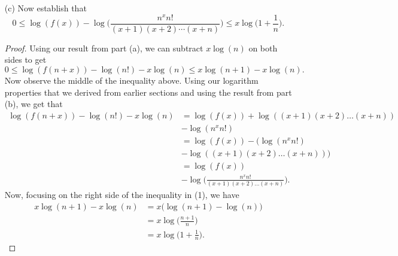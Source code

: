 \begin{enumerate}
\begin{proof}
\begin{align*}
            \end{align*}
            Now assume the statement holds for \( n \geq 1  \). For the \( n+1  \) case, observe that 
            \begin{align*}
                \log(f(x+(n+1)))  &= \log(f((x+n) + 1 ))  \\
                                  &= \log(f(x+n) ((x+n) + 1 )) \\
                                  &= \log (f(x)) + \log ( (x+1)(x+2) \dots (x+n) (x + (n+1)) ).\\
            \end{align*}
            \end{proof}
        \item[(c)] Now establish that 
            \[  0 \leq \log(f(x)) - \log \Big( \frac{ n^{x} n!  }{ (x+1)(x+2) \dotsb (x+n)  }  \Big) \leq x \log \Big( 1 + \frac{ 1 }{ n }  \Big). \]
            \begin{proof}
            Using our result from part (a), we can subtract \( x \log(n)  \) on both sides to get 
            \[ 0 \leq  \log(f(n+x)) - \log(n!) - x \log(n) \leq  x \log(n+1) - x \log(n) \tag{1}.  \]
            Now observe the middle of the inequality above. Using our logarithm properties that we derived from earlier sections and using the result from part (b), we get that 
            \begin{align*}
                \log(f(n+x)) - \log(n!) - x \log(n) &=   \log(f(x)) + \log((x+1)(x+2)\dots (x+n)) \\
                                                    &- \log(n^{x} n! ) \\
                                                    &= \log(f(x)) - \Big(  \log(n^{x} n! )  \\  & - \log((x+1)(x+2) \dots (x+n))   \Big) \\
                                                    &= \log(f(x)) \\ &- \log \Big( \frac{ n^{x} n!  }{ (x+1)(x+2) \dots (x+n) }  \Big).
            \end{align*}
            Now, focusing on the right side of the inequality in (1), we have 
            \begin{align*}
                x \log(n+1) - x \log(n) &= x \Big(  \log(n+1) - \log(n) \Big) \\
                                        &= x \log \Big( \frac{ n +1  }{ n }  \Big) \\
                                        &= x \log \Big(  1 + \frac{ 1 }{ n }  \Big).

\end{align*}
\end{proof}
\end{enumerate}
